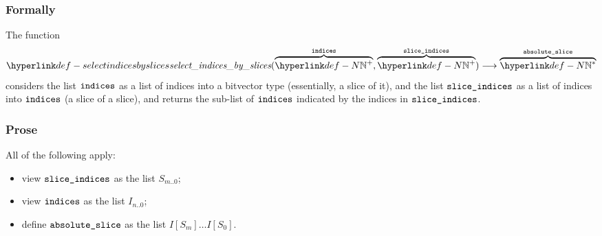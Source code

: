 \subsubsection{Formally}
\begin{mathpar}
\end{mathpar}

\hypertarget{def-selectindicesbyslices}{}
The function
\[
\selectindicesbyslices(\overname{\N^+}{\indices}, \overname{\N^+}{\sliceindices})
\aslto \overname{\N^*}{\vabsslice}
\]
considers the list $\indices$ as a list of indices into a bitvector type (essentially, a slice of it),
and the list $\sliceindices$ as a list of indices into $\indices$ (a slice of a slice),
and returns the sub-list of $\indices$ indicated by the indices in $\sliceindices$.

\subsubsection{Prose}
All of the following apply:
\begin{itemize}
  \item view $\sliceindices$ as the list $S_{m..0}$;
  \item view $\indices$ as the list $I_{n..0}$;
  \item define $\vabsslice$ as the list $I[S_m] \ldots I[S_0]$.
\end{itemize}

